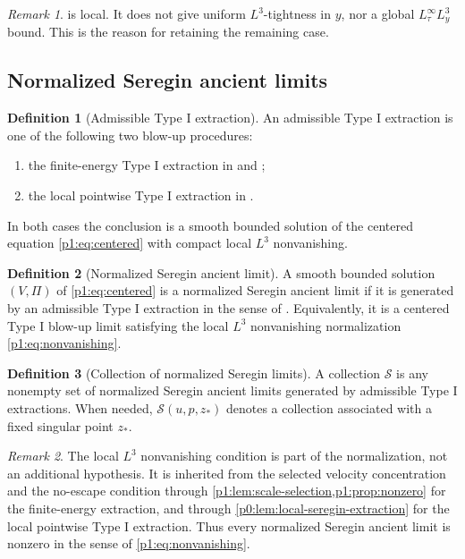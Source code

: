 \documentclass[11pt]{amsart}
\theoremstyle{plain}
\theoremstyle{definition}
\newtheorem{definition}[definition]{Definition}
\theoremstyle{remark}
\newtheorem{remark}[remark]{Remark}
\numberwithin{equation}{section}
\newcommand{\calS}{\mathcal S}
\begin{document}
\begin{remark}\label{p1:rem:no-global-tightness}
 is local.  It does not give uniform
\(L^3\)-tightness in \(y\), nor a global \(L^\infty_\tau L^3_y\) bound.  This
is the reason for retaining the remaining case.
\end{remark}

\subsection{Normalized Seregin ancient limits}

\begin{definition}[Admissible Type I extraction]
\label{p1:def:admissible-type-I-extraction}
An admissible Type I extraction is one of the following two blow-up
procedures:
\begin{enumerate}[label=\textup{(\roman*)}]
\item the finite-energy Type I extraction in 
and ;
\item the local pointwise Type I extraction in
.
\end{enumerate}
In both cases the conclusion is a smooth bounded solution of the centered equation
\eqref{p1:eq:centered} with compact local \(L^3\) nonvanishing.
\end{definition}

\begin{definition}[Normalized Seregin ancient limit]\label{p1:def:seregin-limit}
A smooth bounded solution \((V,\Pi)\) of \eqref{p1:eq:centered} is a normalized
Seregin ancient limit if it is generated by an admissible Type I extraction in
the sense of .  Equivalently, it is
a centered Type I blow-up limit satisfying the local \(L^3\) nonvanishing
normalization \eqref{p1:eq:nonvanishing}.
\end{definition}

\begin{definition}[Collection of normalized Seregin limits]
\label{p1:def:seregin-collection}
A collection \(\calS\) is any nonempty set of normalized Seregin ancient
limits generated by admissible Type I extractions.  When needed,
\(\calS(u,p,z_*)\) denotes a collection associated with a fixed singular point
\(z_*\).
\end{definition}

\begin{remark}
The local \(L^3\) nonvanishing condition is part of the normalization, not an
additional hypothesis.  It is inherited from the selected velocity
concentration and the no-escape condition through
\cref{p1:lem:scale-selection,p1:prop:nonzero} for the finite-energy extraction,
and through \cref{p0:lem:local-seregin-extraction} for the local pointwise
Type I extraction.  Thus every normalized Seregin ancient limit is nonzero in
the sense of \eqref{p1:eq:nonvanishing}.
\end{remark}
\end{document}
